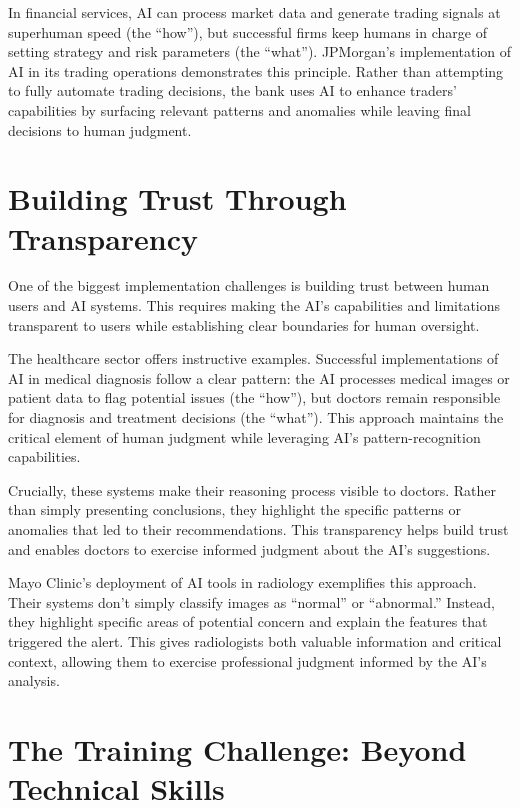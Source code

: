 \documentclass[
  Letterpaper,
]{scrbook}
\begin{document}
In financial services, AI can process market data and generate trading
signals at superhuman speed (the ``how''), but successful firms keep
humans in charge of setting strategy and risk parameters (the ``what'').
JPMorgan's implementation of AI in its trading operations demonstrates
this principle. Rather than attempting to fully automate trading
decisions, the bank uses AI to enhance traders' capabilities by
surfacing relevant patterns and anomalies while leaving final decisions
to human judgment.

\section{Building Trust Through
Transparency}\label{building-trust-through-transparency}

One of the biggest implementation challenges is building trust between
human users and AI systems. This requires making the AI's capabilities
and limitations transparent to users while establishing clear boundaries
for human oversight.

The healthcare sector offers instructive examples. Successful
implementations of AI in medical diagnosis follow a clear pattern: the
AI processes medical images or patient data to flag potential issues
(the ``how''), but doctors remain responsible for diagnosis and
treatment decisions (the ``what''). This approach maintains the critical
element of human judgment while leveraging AI's pattern-recognition
capabilities.

Crucially, these systems make their reasoning process visible to
doctors. Rather than simply presenting conclusions, they highlight the
specific patterns or anomalies that led to their recommendations. This
transparency helps build trust and enables doctors to exercise informed
judgment about the AI's suggestions.

Mayo Clinic's deployment of AI tools in radiology exemplifies this
approach. Their systems don't simply classify images as ``normal'' or
``abnormal.'' Instead, they highlight specific areas of potential
concern and explain the features that triggered the alert. This gives
radiologists both valuable information and critical context, allowing
them to exercise professional judgment informed by the AI's analysis.

\section{The Training Challenge: Beyond Technical
Skills}\label{the-training-challenge-beyond-technical-skills}
\end{document}
